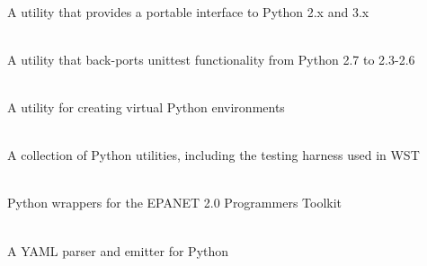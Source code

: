 \begin{description}[topsep=0pt,parsep=0.5em,itemsep=-0.4em,labelindent=2em,leftmargin=4em]
\begin{description}[topsep=0pt,parsep=0.5em,itemsep=-0.4em]
  \item[six]\hfill\\ A utility that provides a portable interface to Python 2.x
    and 3.x
  \item[unittest2]\hfill\\ A utility that back-ports unittest functionality from
    Python 2.7 to 2.3-2.6
  \item[virtualenv]\hfill\\ A utility for creating virtual Python environments
  \end{description}
\item[PyUtilib]\hfill\\ A collection of Python utilities, including the testing
  harness used in WST
\item[PyEPANET]\hfill\\ Python wrappers for the EPANET 2.0 Programmers Toolkit
\item[PyYAML]\hfill\\ A YAML parser and emitter for Python
\end{description}

